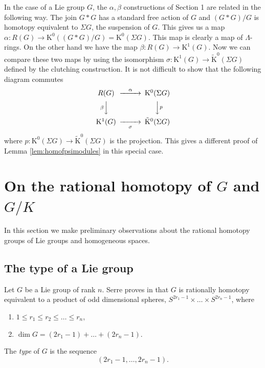 \documentclass[twoside,a4paper,reqno,11pt]{amsart}
\newcommand{\K}{\mathrm{K}}
\begin{document}
In the case of a Lie group $G$, the $\alpha, \beta$ constructions of Section 1 are related in the following way.  The join $G*G$ has a standard free action of $G$ and $(G*G)/G$ is homotopy equivalent to $\Sigma G$, the suspension of $G$.  This gives us a map $\alpha : R(G) \to \K^0((G*G)/G) = \K^0(\Sigma G)$.  This map is clearly a map of $\Lambda$-rings.  On the other hand we have the map $\beta : R(G) \to \K^1(G)$.  Now we can compare these two maps by using the isomorphism $\sigma : \K^1(G) \to \tilde{\K}^0(\Sigma G)$ defined by the clutching construction. It is not difficult to show that the following diagram commutes
$$
\begin{CD}
R(G) @>{\alpha}>> \K^0(\Sigma G) \\
@V{\beta}VV @VV{p}V \\
\K^1(G) @>>{\sigma}> \tilde{\K}^0(\Sigma G)
\end{CD}
$$
where $p : \K^0(\Sigma G) \to \tilde{\K}^0(\Sigma G)$ is the projection. This gives a different proof of Lemma \ref{lem:homofpsimodules} in this special case.






\section{On the rational homotopy of $G$ and $G/K$} \label{sec:type}
In this section we make preliminary observations about the rational homotopy groups of Lie groups and homogeneous spaces.

\subsection{The type of a Lie group} 
Let $G$ be a Lie group of rank $n$.  Serre proves in \cite[Chapitre~V, Section~3]{MR0059548} that $G$ is rationally homotopy equivalent to a product of odd dimensional spheres, $S^{2r_1 - 1} \times \dots \times S^{2r_n - 1}$,
where
\begin{enumerate}
\item $1 \leq r_1 \leq r_2 \leq \dots \leq r_n$,
\item $\dim G = (2r_1-1) + \dots + (2r_n - 1)$.
\end{enumerate}
The {\em type} of $G$ is the sequence
$$
(2r_1-1,  \dots, 2r_n-1).
$$
\end{document}
